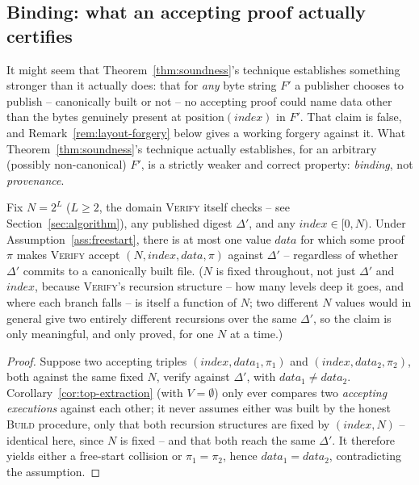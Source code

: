 \subsection{Binding: what an accepting proof actually certifies}
\label{sec:binding}

It might seem that Theorem~\ref{thm:soundness}'s technique establishes
something stronger than it actually does: that for \emph{any} byte string
$F'$ a publisher chooses to publish -- canonically built or not -- no
accepting proof could name data other than the bytes genuinely present at
$\mathrm{position}(\mathit{index})$ in $F'$. That claim is false, and
Remark~\ref{rem:layout-forgery} below gives a working forgery against it.
What Theorem~\ref{thm:soundness}'s technique actually establishes, for an
arbitrary (possibly non-canonical) $F'$, is a strictly weaker and correct
property: \emph{binding}, not \emph{provenance}.

\begin{theorem}[Binding]
\label{thm:binding}
Fix $N = 2^L$ ($L \ge 2$, the domain \textsc{Verify} itself checks -- see
Section~\ref{sec:algorithm}), any published digest $\Delta'$, and any
$\mathit{index} \in [0, N)$. Under Assumption~\ref{ass:freestart}, there is
at most one value $\mathit{data}$ for which some proof $\pi$ makes
\textsc{Verify} accept $(N, \mathit{index}, \mathit{data}, \pi)$ against
$\Delta'$ -- regardless of whether $\Delta'$ commits to a canonically built
file. ($N$ is fixed throughout, not just $\Delta'$ and $\mathit{index}$,
because \textsc{Verify}'s recursion structure -- how many levels deep it
goes, and where each branch falls -- is itself a function of $N$; two
different $N$ values would in general give two entirely different
recursions over the same $\Delta'$, so the claim is only meaningful, and
only proved, for one $N$ at a time.)
\end{theorem}

\begin{proof}
Suppose two accepting triples $(\mathit{index}, \mathit{data}_1, \pi_1)$
and $(\mathit{index}, \mathit{data}_2, \pi_2)$, both against the same fixed
$N$, verify against $\Delta'$, with $\mathit{data}_1 \ne \mathit{data}_2$.
Corollary~\ref{cor:top-extraction} (with $V = \emptyset$) only ever
compares two \emph{accepting executions} against each other; it never
assumes either was built by the honest \textsc{Build} procedure, only that
both recursion structures are fixed by $(\mathit{index}, N)$ -- identical
here, since $N$ is fixed -- and that both reach the same $\Delta'$. It
therefore yields either a free-start collision or $\pi_1 = \pi_2$, hence
$\mathit{data}_1 = \mathit{data}_2$, contradicting the assumption.
\end{proof}

